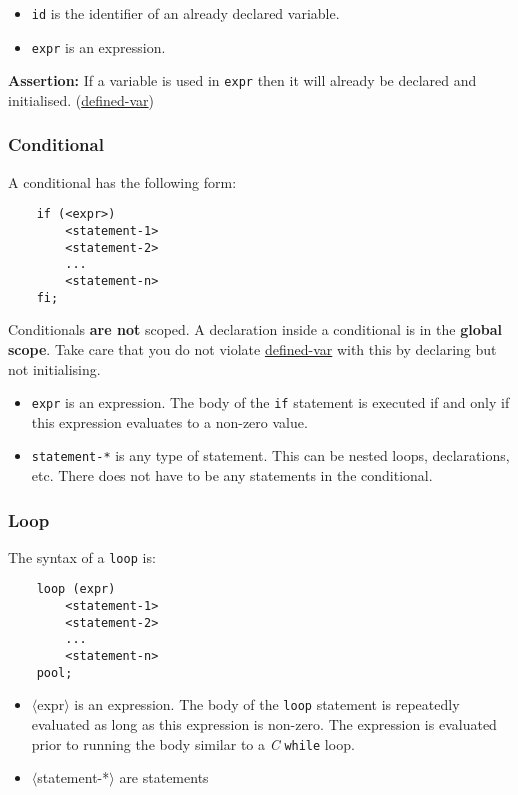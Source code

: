 \documentclass{article}
\newcommand{\code}[1]{\texttt{\textmd{#1}}}
\newcommand{\assertion}[2]{\textbf{Assertion: }#1 (\hyperlink{#2}{#2})}
\newcommand{\assertionref}[1]{\hyperlink{#1}{#1}}
\begin{document}
\begin{itemize}
	\item \code{id} is the identifier of an already declared variable.
	\item \code{expr} is an expression.
\end{itemize}

\assertion{If a variable is used in \code{expr} then it will already be declared and initialised.}
{defined-var}

\subsubsection{Conditional}
\label{sssec:conditional}
A conditional has the following form:
\begin{lstlisting}
	if (<expr>)
		<statement-1>
		<statement-2>
		...
		<statement-n>
	fi;
\end{lstlisting}

Conditionals \textbf{are not} scoped. A declaration inside a conditional is in the \textbf{global
scope}. Take care that you do not violate \assertionref{defined-var} with this by declaring but
not initialising.

\begin {itemize}
	\item
    \code{expr} is an expression. The body of the \code{if} statement is executed if and only if
    this expression evaluates to a non-zero value.
	\item
    \code{statement-*} is any type of statement. This can be nested loops, declarations, etc. There
    does not have to be any statements in the conditional.
\end{itemize}

\subsubsection{Loop}
\label{sssec:loop}

The syntax of a \code{loop} is:

\begin{lstlisting}
	loop (expr)
		<statement-1>
		<statement-2>
		...
		<statement-n>
	pool;
\end{lstlisting}

\begin {itemize}
	\item{$\langle$expr$\rangle$} is an expression. The body of the \texttt{loop} statement is repeatedly evaluated as long as
	this expression is non-zero. The expression is evaluated prior to running the body similar to a \textit{C} \texttt{while} loop.
	\item{$\langle$statement-*$\rangle$} are statements
\end{itemize}
\end{document}
